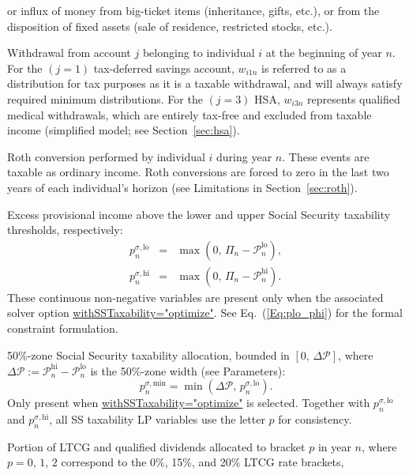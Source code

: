 \documentclass[fleqn,12pt]{report}
\newcommand{\code}[1]{\url{#1}}
\begin{document}
\begin{description}[leftmargin=4em,style=multiline]
	or influx of money from big-ticket items (inheritance, gifts, etc.),
	or from the disposition of fixed assets (sale of residence, restricted stocks, etc.).
\item [$w_{ijn}$]
	Withdrawal from account $j$ belonging to individual $i$ at the beginning of year $n$.
	For the $(j=1)$ tax-deferred savings account, $w_{i1n}$ is referred to as a distribution for
	tax purposes as it is a taxable withdrawal, and will always satisfy required minimum distributions.
	For the $(j=3)$ HSA, $w_{i3n}$ represents qualified medical withdrawals, which are entirely
	tax-free and excluded from taxable income (simplified model; see Section~\ref{sec:hsa}).
\item [$x_{in}$]
	Roth conversion performed by individual $i$ during year $n$.
	These events are taxable as ordinary income.
	Roth conversions are forced to zero in the last two years of each
	individual's horizon (see Limitations in Section~\ref{sec:roth}).
\item [$p^{\sigma,\mathrm{lo}}_n$, $p^{\sigma,\mathrm{hi}}_n$]
	Excess provisional income above the lower and upper Social Security taxability
	thresholds, respectively:
	\begin{eqnarray}
		p^{\sigma,\mathrm{lo}}_n &=& \max(0,\,\Pi_n - \mathcal{P}^{\mathrm{lo}}_n), \\
		p^{\sigma,\mathrm{hi}}_n &=& \max(0,\,\Pi_n - \mathcal{P}^{\mathrm{hi}}_n).
	\end{eqnarray}
	These continuous non-negative variables are present only when the associated solver option
	\code{withSSTaxability="optimize"}.
	See Eq.~(\ref{Eq:plo_phi}) for the formal constraint formulation.
\item [$p^{\sigma,\mathrm{min}}_n$]
	50\%-zone Social Security taxability allocation, bounded in $[0,\,\Delta\mathcal{P}]$,
	where $\Delta\mathcal{P} := \mathcal{P}^{\mathrm{hi}}_n - \mathcal{P}^{\mathrm{lo}}_n$ is the 50\%-zone width (see Parameters):
	\begin{equation}
		p^{\sigma,\mathrm{min}}_n = \min(\Delta\mathcal{P},\,p^{\sigma,\mathrm{lo}}_n).
	\end{equation}
	Only present when \code{withSSTaxability="optimize"} is selected.
	Together with $p^{\sigma,\mathrm{lo}}_n$ and $p^{\sigma,\mathrm{hi}}_n$, all SS
	taxability LP variables use the letter $p$ for consistency.
\item [$q_{pn}$]
	Portion of LTCG and qualified dividends allocated to bracket $p$ in year $n$,
	where $p=0$, $1$, $2$ correspond to the 0\%, 15\%, and 20\% LTCG rate brackets,

\end{description}
\end{document}
